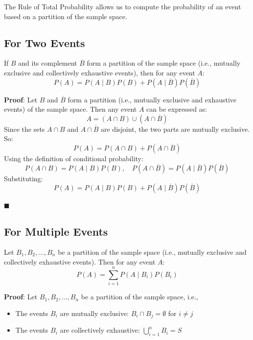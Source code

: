 \documentclass[twoside]{book}
\begin{document}
The Rule of Total Probability allows us to compute the probability of an event based on a partition of the sample space.

\subsection{For Two Events}
\begin{textbox}
    If \( B \) and its complement \( \overline{B} \) form a partition of the sample space (i.e., mutually exclusive and collectively exhaustive events), then for any event \( A \):
\[
P(A) = P(A \mid B)P(B) + P(A \mid \overline{B})P(\overline{B})
\]
\end{textbox}
\textbf{Proof}: Let \( B \) and \( \overline{B} \) form a partition (i.e., mutually exclusive and exhaustive events) of the sample space. Then any event \( A \) can be expressed as:
\[
A = (A \cap B) \cup (A \cap \overline{B})
\]
Since the sets \( A \cap B \) and \( A \cap \overline{B} \) are disjoint, the two parts are mutually exclusive. So:
\[
P(A) = P(A \cap B) + P(A \cap \overline{B})
\]
Using the definition of conditional probability:
\[
P(A \cap B) = P(A \mid B)P(B), \quad P(A \cap \overline{B}) = P(A \mid \overline{B})P(\overline{B})
\]
Substituting:
\[
P(A) = P(A \mid B)P(B) + P(A \mid \overline{B})P(\overline{B})
\]

\hfill\(\blacksquare\)

\subsection{For Multiple Events}

\begin{textbox}

Let \( B_1, B_2, \dots, B_n \) be a partition of the sample space (i.e., mutually exclusive and collectively exhaustive events). Then for any event \( A \):
\[
P(A) = \sum_{i=1}^{n} P(A \mid B_i)P(B_i)
\]
\end{textbox}

\textbf{Proof}: Let \( B_1, B_2, \dots, B_n \) be a partition of the sample space, i.e.,

\begin{itemize}
    \item The events \( B_i \) are mutually exclusive: \( B_i \cap B_j = \emptyset \) for \( i \ne j \)
    \item The events \( B_i \) are collectively exhaustive: \( \bigcup_{i=1}^n B_i = S \)
\end{itemize}
\end{document}

